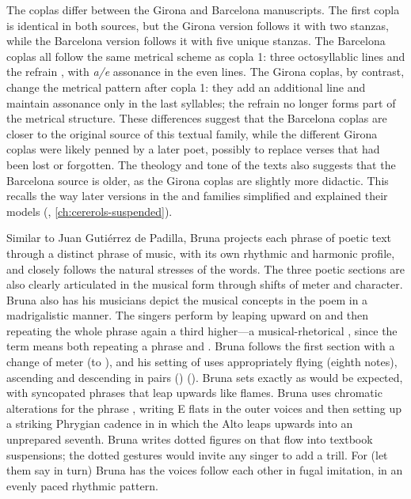 The coplas differ between the Girona and Barcelona manuscripts.
The first copla is identical in both sources, but the Girona version follows it
with two stanzas, while the Barcelona version follows it with five unique
stanzas.
The Barcelona coplas all follow the same metrical scheme as copla 1: three
octosyllablic lines and the refrain , with \emph{a/e} assonance
in the even lines.
The Girona coplas, by contrast, change the metrical pattern after copla 1: they
add an additional line and maintain assonance only in the last syllables; the
 refrain no longer forms part of the metrical structure.
These differences suggest that the Barcelona coplas are closer to the original
source of this textual family, while the different Girona coplas were likely
penned by a later poet, possibly to replace verses that had been lost or
forgotten.
The theology and tone of the texts also suggests that the Barcelona source is
older, as the Girona coplas are slightly more didactic.
This recalls the way later versions in the  and  families simplified and explained their
models (, \ref{ch:cererols-suspended}).


Similar to Juan Gutiérrez de Padilla, Bruna projects each phrase of poetic
text through a distinct phrase of music, with its own rhythmic and harmonic
profile, and closely follows the natural stresses of the words.  
The three poetic sections are also clearly articulated in the musical form
through shifts of meter and character.
Bruna also has his musicians depict the musical concepts in the poem in a
madrigalistic manner.  
The singers perform  by leaping upward on
 and then repeating the whole phrase again a third higher---a
musical-rhetorical , since the term means both repeating a
phrase and .
Bruna follows the first section with a change of meter (to \meterC), and his
setting of  uses appropriately
flying  (eighth notes), ascending and descending in pairs
() ().
Bruna sets  exactly as would be expected, with
syncopated phrases that leap upwards like flames.
Bruna uses chromatic alterations for the phrase ,
writing E flats in the outer voices and then setting up a
striking Phrygian cadence in in which the Alto leaps upwards
into an unprepared seventh.  
Bruna writes dotted figures on  that flow into
textbook suspensions; the dotted gestures would invite any singer to add a
trill.
For  (let them say in turn) Bruna has the voices follow
each other in fugal imitation, in an evenly paced rhythmic pattern.

